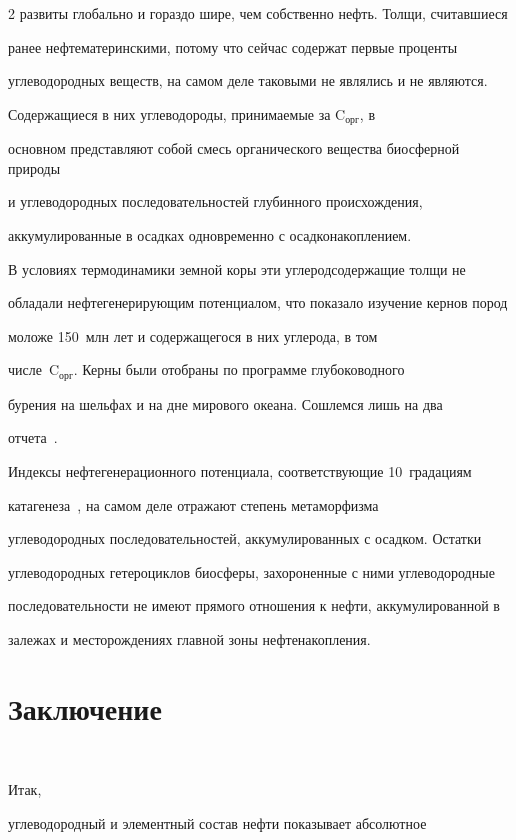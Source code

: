 \begin{multicols}{2}
развиты глобально и гораздо шире, чем собственно нефть. Толщи, считавшиеся 

ранее нефтематеринскими, потому что сейчас содержат первые проценты 

углеводородных веществ, на самом деле таковыми не являлись и не являются. 

Содержащиеся в них углеводороды, принимаемые за C$_{\mathrm{орг}}$, в 

основном представляют собой смесь органического вещества биосферной природы 

и углеводородных последовательностей глубинного происхождения, 

аккумулированные в осадках одновременно с осадконакоплением. 

     

     В условиях термодинамики земной коры эти углеродсодержащие толщи не 

обладали нефтегенерирующим потенциалом, что показало изучение кернов пород 

моложе 150~млн лет и содержащегося в них углерода, в том 

числе~C$_{\mathrm{орг}}$. Керны были отобраны по программе глубоководного 

бурения на шельфах и на дне мирового океана. Сошлемся лишь на два 

отчета~\cite{31s, 32s}. 

     

     Индексы нефтегенерационного потенциала, соответ\-ствующие 10~градациям 

катагенеза~\cite{3s}, на самом деле отражают степень метаморфизма 

углеводо\-родных последовательностей, аккумулированных с осадком. Остатки 

углеводородных гетероциклов биосферы, захороненные с ними углеводородные 

последовательности не имеют прямого отношения к нефти, аккумулированной в 

залежах и месторождениях главной зоны нефтенакопления.

     

     

\section{Заключение}

\

     Итак,      

углеводородный и элементный состав нефти показывает абсолютное 


\end{multicols}
